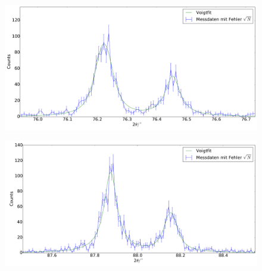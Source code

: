 \begin{figure}[H]
\begin{minipage}{.5\textwidth}
  \centering
  \includegraphics[scale=0.15]{messung_pulver_5}
  \label{fig:pul_mess_5}
\end{minipage}
\hspace{0.5cm}
\begin{minipage}{.5\textwidth}
  \centering
  \includegraphics[scale=0.15]{messung_pulver_6}
  \label{fig:pul_mess_6}
\end{minipage}
\end{figure}
